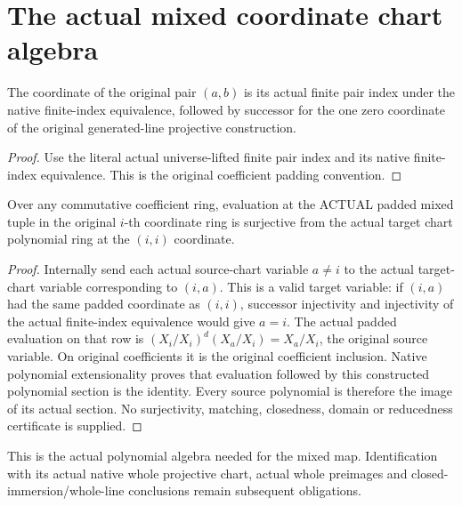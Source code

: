 \section{The actual mixed coordinate chart algebra}
\begin{definition}
\label{def:central-embedding-actual-mixed-padded-pair-coordinate}
\leanok
The coordinate of the original pair $(a,b)$ is its actual finite pair index
under the native finite-index equivalence, followed by successor for the one
zero coordinate of the original generated-line projective construction.
\end{definition}
\begin{proof}
Use the literal actual universe-lifted finite pair index and its native
finite-index equivalence. This is the original coefficient padding convention.
\end{proof}
\begin{lemma}
\label{lem:central-embedding-actual-mixed-chart-polynomial-surjective}
\leanok
Over any commutative coefficient ring, evaluation at the ACTUAL padded
mixed tuple in the original $i$-th coordinate ring is surjective from the
actual target chart polynomial ring at the $(i,i)$ coordinate.
\end{lemma}
\begin{proof}
Internally send each actual source-chart variable $a\ne i$ to the actual
target-chart variable corresponding to $(i,a)$. This is a valid target variable:
if $(i,a)$ had the same padded coordinate as $(i,i)$, successor injectivity
and injectivity of the actual finite-index equivalence would give $a=i$.
The actual padded evaluation on that row is
$(X_i/X_i)^d(X_a/X_i)=X_a/X_i$, the original source variable. On original
coefficients it is the original coefficient inclusion. Native polynomial
extensionality proves that evaluation followed by this constructed polynomial
section is the identity. Every source polynomial is therefore the image of
its actual section. No surjectivity, matching, closedness, domain or reducedness
certificate is supplied.
\end{proof}
This is the actual polynomial algebra needed for the mixed map. Identification
with its actual native whole projective chart, actual whole preimages and
closed-immersion/whole-line conclusions remain subsequent obligations.
